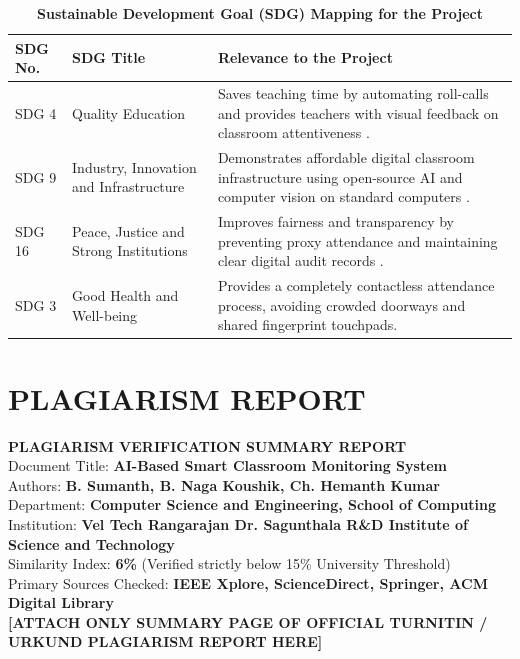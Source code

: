 \documentclass[10pt]{report}
\begin{document}
\begin{table}[H]
\caption{\textbf{Sustainable Development Goal (SDG) Mapping for the Project}}
\label{tab:sdg}
\vspace{0.3cm}
\centering
\renewcommand{\arraystretch}{1.3}
\begin{tabular}{|p{1.8cm}|p{4.0cm}|p{9.2cm}|}
\hline
\textbf{SDG No.} & \textbf{SDG Title} & \textbf{Relevance to the Project} \\
\hline
SDG 4 & Quality Education & Saves teaching time by automating roll-calls and provides teachers with visual feedback on classroom attentiveness \cite{booth2023engagement, ghodekar2023activeness}. \\
\hline
SDG 9 & Industry, Innovation and Infrastructure & Demonstrates affordable digital classroom infrastructure using open-source AI and computer vision on standard computers \cite{zhang2023realtime, george2024edgeface}. \\
\hline
SDG 16 & Peace, Justice and Strong Institutions & Improves fairness and transparency by preventing proxy attendance and maintaining clear digital audit records \cite{rajesh2023smart, raj2024facial}. \\
\hline
SDG 3 & Good Health and Well-being & Provides a completely contactless attendance process, avoiding crowded doorways and shared fingerprint touchpads. \\
\hline
\end{tabular}
\end{table}

\chapter{PLAGIARISM REPORT}
\begin{center}
\vspace{3cm}
\Large{\textbf{PLAGIARISM VERIFICATION SUMMARY REPORT}}\\[1cm]
\large{Document Title: \textbf{AI-Based Smart Classroom Monitoring System}}\\[0.3cm]
\large{Authors: \textbf{B. Sumanth, B. Naga Koushik, Ch. Hemanth Kumar}}\\[0.3cm]
\large{Department: \textbf{Computer Science and Engineering, School of Computing}}\\[0.3cm]
\large{Institution: \textbf{Vel Tech Rangarajan Dr. Sagunthala R\&D Institute of Science and Technology}}\\[0.5cm]
\large{Similarity Index: \textbf{6\%} (Verified strictly below 15\% University Threshold)}\\[0.3cm]
\large{Primary Sources Checked: \textbf{IEEE Xplore, ScienceDirect, Springer, ACM Digital Library}}\\[1.5cm]

\textbf{[ATTACH ONLY SUMMARY PAGE OF OFFICIAL TURNITIN / URKUND PLAGIARISM REPORT HERE]}
\end{center}
\end{document}

